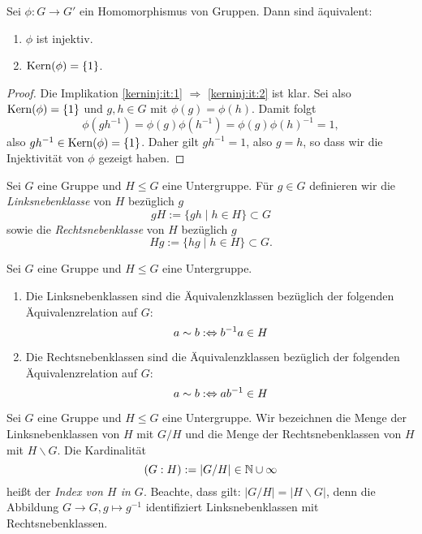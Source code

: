 \documentclass{book}
\begin{document}
\begin{prop}
    \label{prop:kerninj}
    Sei $\phi: G \to G'$ ein Homomorphismus von Gruppen. Dann sind äquivalent:
    \begin{enumerate}[label=(\roman*)]
        \item\label{kerninj:it:1} $\phi$ ist injektiv. 
        \item\label{kerninj:it:2} $\Kern(\phi) = \{1 \}$. 
    \end{enumerate}
\end{prop}
\begin{proof}
    Die Implikation \ref{kerninj:it:1} $\Rightarrow$ \ref{kerninj:it:2} ist klar. Sei also $\Kern(\phi) = \{1\}$ und $g,h \in G$ mit $\phi(g) = \phi(h)$. Damit folgt
    \[
        \phi(gh^{-1}) = \phi(g) \phi(h^{-1}) = \phi(g) \phi(h)^{-1} = 1, 
    \]
    also $gh^{-1} \in \Kern(\phi) = \{1 \}$. Daher gilt $gh^{-1} = 1$, also $g = h$, so dass wir die Injektivität von $\phi$ gezeigt haben.
\end{proof}

\begin{defi}
    \label{defi:neben}
    Sei $G$ eine Gruppe und $H \le G$ eine Untergruppe. Für $g \in G$
    definieren wir die \emph{Linksnebenklasse} von $H$ bezüglich $g$
    \[
        g H := \{g h \;|\; h \in H \} \subset G
    \]
    sowie die \emph{Rechtsnebenklasse} von $H$ bezüglich $g$
    \[
        H g := \{h g \;|\; h \in H \} \subset G.
    \]
\end{defi}

\begin{prob}
    \label{prob:neben} Sei $G$ eine Gruppe und $H \le G$ eine Untergruppe. 
    \begin{enumerate}
        \item Die Linksnebenklassen sind die Äquivalenzklassen bezüglich der folgenden Äquivalenzrelation auf $G$:
            \[
                a \sim b :\Leftrightarrow b^{-1}a \in H
            \]
        \item Die Rechtsnebenklassen sind die Äquivalenzklassen bezüglich der folgenden Äquivalenzrelation auf $G$:
            \[
                a \sim b :\Leftrightarrow ab^{-1} \in H
            \]
    \end{enumerate}
\end{prob}

\begin{term}
    \label{term:index} 
    Sei $G$ eine Gruppe und $H \le G$ eine Untergruppe. 
    Wir bezeichnen die Menge der Linksnebenklassen von $H$ mit $G/H$ und die
    Menge der Rechtsnebenklassen von $H$ mit $H \backslash G$. 
    Die Kardinalität
    \[
        (G:H) := |G/H| \in \mathbb{N} \cup {\infty}
    \]
    heißt der \emph{Index von $H$ in $G$}. Beachte, dass gilt: $|G/H| = |H \backslash
    G|$, denn die Abbildung $G \to G, g \mapsto g^{-1}$ identifiziert
    Linksnebenklassen mit Rechtsnebenklassen.
\end{term}
\end{document}
